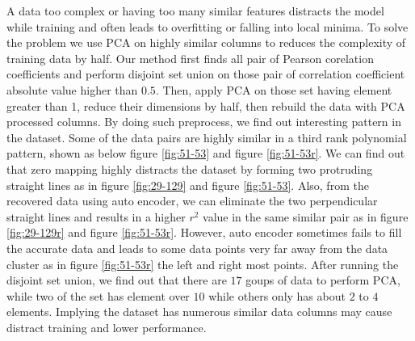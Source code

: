 \documentclass[11pt,a4paper]{article}
\begin{document}
A data too complex or having too many similar features distracts the model while training and often leads to overfitting or falling into local minima.
To solve the problem we use PCA on highly similar columns to reduces the complexity of training data by half.
Our method first finds all pair of Pearson corelation coefficients and perform disjoint set union on those pair of correlation coefficient absolute value higher than $0.5$.
Then, apply PCA on those set having element greater than 1, reduce their dimensions by half, then rebuild the data with PCA processed columns.
By doing such preprocess, we find out interesting pattern in the dataset.
Some of the data pairs are highly similar in a third rank polynomial pattern, shown as below figure \ref{fig:51-53} and figure \ref{fig:51-53r}.
We can find out that zero mapping highly distracts the dataset by forming two protruding straight lines as in figure \ref{fig:29-129} and figure \ref{fig:51-53}.
Also, from the recovered data using auto encoder, we can eliminate the two perpendicular straight lines and results in a higher $r^2$ value in the same similar pair as in figure \ref{fig:29-129r} and figure \ref{fig:51-53r}.
However, auto encoder sometimes fails to fill the accurate data and leads to some data points very far away from the data cluster as in figure \ref{fig:51-53r} the left and right most points.
After running the disjoint set union, we find out that there are $17$ goups of data to perform PCA, while two of the set has element over $10$ while others only has about $2$ to $4$ elements.
Implying the dataset has numerous similar data columns may cause distract training and lower performance.
\end{document}
